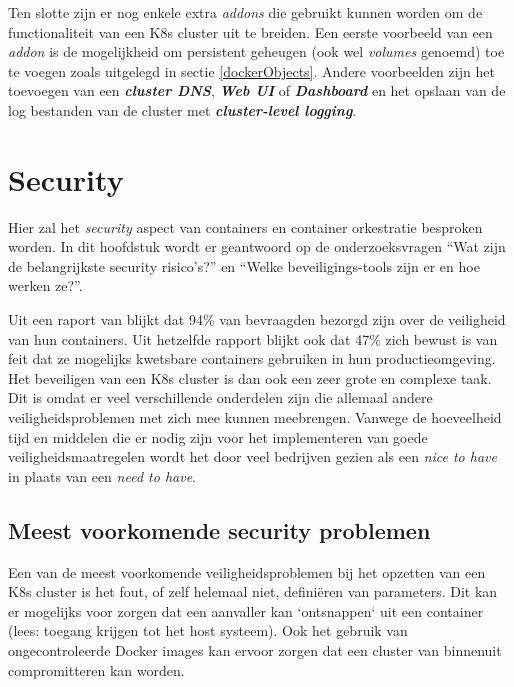 Ten slotte zijn er nog enkele extra \textit{addons} die gebruikt kunnen worden om de functionaliteit van een K8s cluster uit te breiden. Een eerste voorbeeld van een \textit{addon} is de mogelijkheid om persistent geheugen (ook wel \textit{volumes} genoemd) toe te voegen zoals uitgelegd in sectie \ref{dockerObjects}. Andere voorbeelden zijn het toevoegen van een \textbf{\textit{cluster DNS}}, \textbf{\textit{Web UI}} of \textbf{\textit{Dashboard}} en het opslaan van de log bestanden van de cluster met \textbf{\textit{cluster-level logging}}.
\clearpage

\section{Security}

Hier zal het \textit{security} aspect van containers en container orkestratie besproken worden. In dit hoofdstuk wordt er geantwoord op de onderzoeksvragen ``Wat zijn de belangrijkste security risico's?'' en ``Welke beveiligings-tools zijn er en hoe werken ze?''.

Uit een raport van \textcite{Tripwire2019} blijkt dat 94\% van bevraagden bezorgd zijn over de veiligheid van hun containers. Uit hetzelfde rapport blijkt ook dat 47\% zich bewust is van feit dat ze mogelijks kwetsbare containers gebruiken in hun productieomgeving. Het beveiligen van een K8s cluster is dan ook een zeer grote en complexe taak. Dit is omdat er veel verschillende onderdelen zijn die allemaal andere veiligheidsproblemen met zich mee kunnen meebrengen. Vanwege de hoeveelheid tijd en middelen die er nodig zijn voor het implementeren van goede veiligheidsmaatregelen wordt het door veel bedrijven gezien als een \textit{nice to have} in plaats van een \textit{need to have}.


\subsection{Meest voorkomende security problemen}
Een van de meest voorkomende veiligheidsproblemen bij het opzetten van een K8s cluster is het fout, of zelf helemaal niet, definiëren van parameters. Dit kan er mogelijks voor zorgen dat een aanvaller kan `ontsnappen` uit een container (lees: toegang krijgen tot het host systeem). Ook het gebruik van ongecontroleerde Docker images kan ervoor zorgen dat een cluster van binnenuit compromitteren kan worden.

